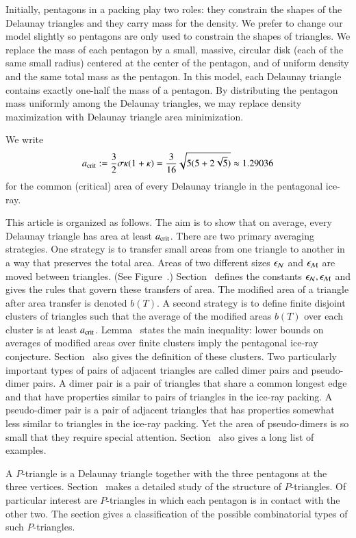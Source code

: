 Initially, pentagons in a packing play two roles: they constrain the
shapes of the Delaunay triangles and they carry mass for the density.
We prefer to change our model slightly so pentagons are only used
to constrain the shapes of triangles.  We replace the mass of each
pentagon by a small, massive, circular disk (each of the same small
radius) centered at the center of the pentagon, and of uniform density
and the same total mass as the pentagon.  In this model, each Delaunay
triangle contains exactly one-half the mass of a pentagon.  By
distributing the pentagon mass uniformly among the Delaunay triangles,
we may replace density maximization with Delaunay triangle area
minimization.

We write 
\[
a_\text{crit} := \frac{3}{2}{ \sigma \kappa(1+\kappa)} =
\frac{3}{16}\sqrt{5(5+2\sqrt5)}\approx 1.29036
\] %
for the common (critical) area of every Delaunay triangle in the 
pentagonal ice-ray.

This article is organized as follows.  The aim is to show that on
average, every Delaunay triangle has area at least $a_\text{crit}$.  There
are two primary averaging strategies.  One strategy is to transfer
small areas from one triangle to another in a way that preserves the
total area.  Areas of two different sizes $\epsilon_{\mathcal N}$ and $\epsilon_{\mathcal M}$ are
moved between triangles. (See Figure~.)  Section~
defines the constants $\epsilon_{\mathcal N},\epsilon_{\mathcal M}$ and gives the rules that govern
these transfers of area.  The modified area of a triangle after area
transfer is denoted $b(T)$.  A second strategy is to define finite
disjoint clusters of triangles such that the average of the modified
areas $b(T)$ over each cluster is at least $a_\text{crit}$.  Lemma~
states the main inequality:
lower bounds on averages of modified areas over finite
clusters imply the pentagonal ice-ray conjecture.
Section~ also gives the definition of these clusters.
Two particularly important types of pairs of adjacent triangles are
called dimer pairs and pseudo-dimer pairs.  A dimer pair is a pair of
triangles that share a common longest edge and that have properties
similar to pairs of triangles in the ice-ray packing.
A pseudo-dimer pair is a pair of adjacent triangles that has properties
somewhat less similar to triangles in the ice-ray packing.  Yet the area
of pseudo-dimers is so small that they require special attention.
Section~ also gives a long list of examples.

A $P$-triangle is a Delaunay triangle together with the three pentagons
at the three vertices. Section~ makes a detailed
study of the structure of $P$-triangles.  Of particular interest are
$P$-triangles in which each pentagon is in contact with the other two.
The section gives a classification of the possible combinatorial types
of such $P$-triangles.

